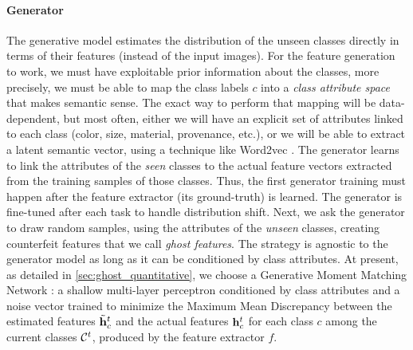 \paragraph{Generator} The generative model estimates the distribution of the unseen classes directly
in terms of their features (instead of the input images). For the feature generation to work, we
must have exploitable prior information about the classes, more precisely, we must be able to map
the class labels $c$ into a \textit{class attribute space} that makes semantic sense. The exact way
to perform that mapping will be data-dependent, but most often, either we will have an explicit set
of attributes linked to each class (color, size, material, provenance, etc.), or we will be able to
extract a latent semantic vector, using a technique like Word2vec
\citep{mikolov2013word2vec,pennington2014glove}. The generator learns to link the attributes of the
\textit{seen} classes to the actual feature vectors extracted from the training samples of those
classes. Thus, the first generator training must happen after the feature extractor (its
ground-truth) is learned. The generator is fine-tuned after each task to handle distribution shift.
Next, we ask the generator to draw random samples, using the attributes of the \textit{unseen}
classes, creating counterfeit features that we call \textit{ghost features}. The strategy is
agnostic to the generator model as long as it can be conditioned by class attributes.  At present,
as detailed in \autoref{sec:ghost_quantitative}, we choose a Generative Moment Matching Network
\citep{li2015gmmn}: a shallow multi-layer perceptron conditioned by class attributes and a noise
vector trained to minimize the Maximum Mean Discrepancy
\citep{gretton2007twosampleMMD,gretton2012twosampletestMMD} between the estimated features
$\tilde{\mathbf{h}}^t_c$ and the actual features $\mathbf{h}^t_c$ for each class $c$ among the current classes
$\mathcal{C}^t$, produced by the feature extractor $f$.



\label{sec:ghost_generator}

